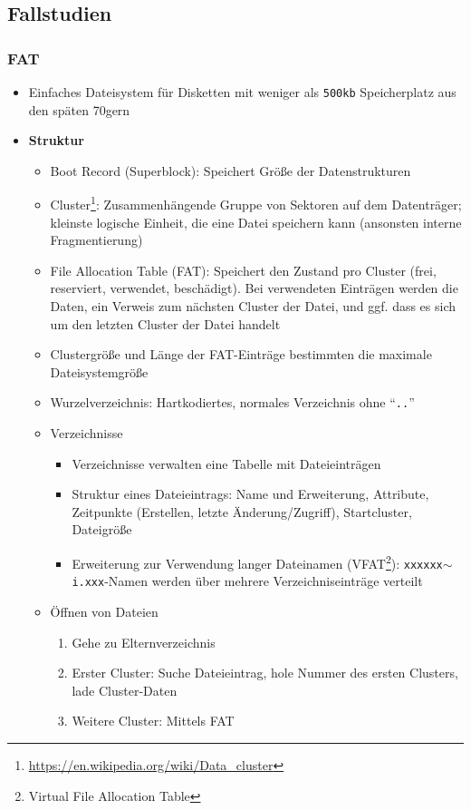 \subsection{Fallstudien}

\subsubsection{FAT}
\begin{itemize}
	\item Einfaches Dateisystem für Disketten mit weniger als \texttt{500kb} Speicherplatz aus den späten 70gern
	\item \textbf{Struktur}
	\begin{itemize}
		\item Boot Record (Superblock): Speichert Größe der Datenstrukturen
		\item Cluster\footnote{\url{https://en.wikipedia.org/wiki/Data_cluster}}: Zusammenhängende Gruppe von Sektoren auf dem Datenträger; kleinste logische Einheit, die eine Datei speichern kann (ansonsten interne Fragmentierung)
		\item File Allocation Table (FAT): Speichert den Zustand pro Cluster (frei, reserviert, verwendet, beschädigt). Bei verwendeten Einträgen werden die Daten, ein Verweis zum nächsten Cluster der Datei, und ggf. dass es sich um den letzten Cluster der Datei handelt 
		\item Clustergröße und Länge der FAT-Einträge bestimmten die maximale Dateisystemgröße
		\item Wurzelverzeichnis: Hartkodiertes, normales Verzeichnis ohne "`\texttt{..}"'
		\item Verzeichnisse
		\begin{itemize}
			\item Verzeichnisse verwalten eine Tabelle mit Dateieinträgen
			\item Struktur eines Dateieintrags: Name und Erweiterung, Attribute, Zeitpunkte (Erstellen, letzte Änderung/Zugriff), Startcluster, Dateigröße
			\item Erweiterung zur Verwendung langer Dateinamen (VFAT\footnote{Virtual File Allocation Table}): \texttt{xxxxxx\(\sim\)i.xxx}-Namen werden über mehrere Verzeichniseinträge verteilt
		\end{itemize}
		\item Öffnen von Dateien
		\begin{enumerate}
			\item Gehe zu Elternverzeichnis
			\item Erster Cluster: Suche Dateieintrag, hole Nummer des ersten Clusters, lade Cluster-Daten
			\item Weitere Cluster: Mittels FAT
		\end{enumerate}
	\end{itemize}
\end{itemize}

